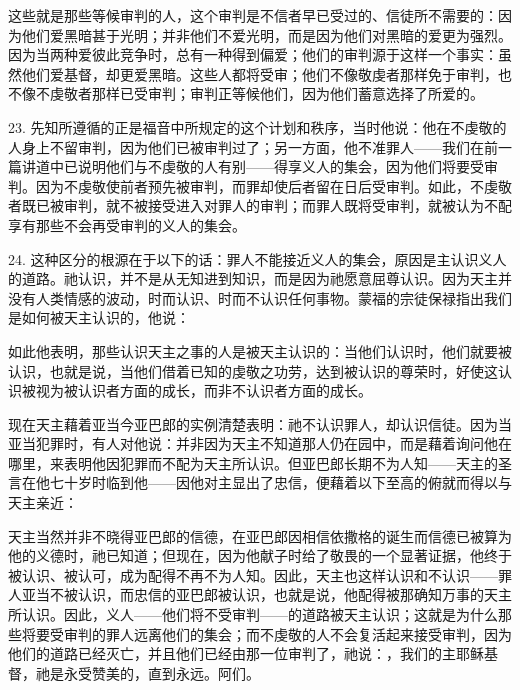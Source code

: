 这些就是那些等候审判的人，这个审判是不信者早已受过的、信徒所不需要的：因为他们爱黑暗甚于光明；并非他们不爱光明，而是因为他们对黑暗的爱更为强烈。因为当两种爱彼此竞争时，总有一种得到偏爱；他们的审判源于这样一个事实：虽然他们爱基督，却更爱黑暗。这些人都将受审；他们不像敬虔者那样免于审判，也不像不虔敬者那样已受审判；审判正等候他们，因为他们蓄意选择了所爱的。\par

23. 先知所遵循的正是福音中所规定的这个计划和秩序，当时他说：他在不虔敬的人身上不留审判，因为他们已被审判过了；另一方面，他不准罪人——我们在前一篇讲道中已说明他们与不虔敬的人有别——得享义人的集会，因为他们将要受审判。因为不虔敬使前者预先被审判，而罪却使后者留在日后受审判。如此，不虔敬者既已被审判，就不被接受进入对罪人的审判；而罪人既将受审判，就被认为不配享有那些不会再受审判的义人的集会。\par

24. 这种区分的根源在于以下的话：罪人不能接近义人的集会，原因是主认识义人的道路。祂认识，并不是从无知进到知识，而是因为祂愿意屈尊认识。因为天主并没有人类情感的波动，时而认识、时而不认识任何事物。蒙福的宗徒保禄指出我们是如何被天主认识的，他说：\par

如此他表明，那些认识天主之事的人是被天主认识的：当他们认识时，他们就要被认识，也就是说，当他们借着已知的虔敬之功劳，达到被认识的尊荣时，好使这认识被视为被认识者方面的成长，而非不认识者方面的成长。\par

现在天主藉着亚当今亚巴郎的实例清楚表明：祂不认识罪人，却认识信徒。因为当亚当犯罪时，有人对他说：并非因为天主不知道那人仍在园中，而是藉着询问他在哪里，来表明他因犯罪而不配为天主所认识。但亚巴郎长期不为人知——天主的圣言在他七十岁时临到他——因他对主显出了忠信，便藉着以下至高的俯就而得以与天主亲近：\par

天主当然并非不晓得亚巴郎的信德，在亚巴郎因相信依撒格的诞生而信德已被算为他的义德时，祂已知道；但现在，因为他献子时给了敬畏的一个显著证据，他终于被认识、被认可，成为配得不再不为人知。因此，天主也这样认识和不认识——罪人亚当不被认识，而忠信的亚巴郎被认识，也就是说，他配得被那确知万事的天主所认识。因此，义人——他们将不受审判——的道路被天主认识；这就是为什么那些将要受审判的罪人远离他们的集会；而不虔敬的人不会复活起来接受审判，因为他们的道路已经灭亡，并且他们已经由那一位审判了，祂说：，我们的主耶稣基督，祂是永受赞美的，直到永远。阿们。\par

